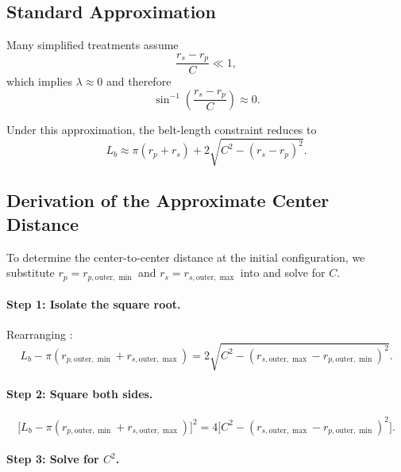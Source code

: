 \documentclass[11pt]{article}
\numberwithin{equation}{section}
\begin{document}
\subsection{Standard Approximation}

Many simplified treatments assume
\[
\frac{r_s - r_p}{C} \ll 1,
\]
which implies $\lambda \approx 0$ and therefore
\[
\sin^{-1}\!\left(\frac{r_s - r_p}{C}\right) \approx 0.
\]

Under this approximation, the belt-length constraint
 reduces to
\begin{equation}
L_b \approx \pi(r_p + r_s) + 2\sqrt{C^2 - (r_s - r_p)^2}.
\label{eq:belt_length_approx}
\end{equation}

\subsection{Derivation of the Approximate Center Distance}

To determine the center-to-center distance at the initial configuration,
we substitute $r_p = r_{p,\text{outer},\min}$ and $r_s = r_{s,\text{outer},\max}$ into
 and solve for $C$.

\paragraph{Step 1: Isolate the square root.}

Rearranging :
\begin{equation}
L_b - \pi(r_{p,\text{outer},\min} + r_{s,\text{outer},\max})
=
2\sqrt{C^2 - (r_{s,\text{outer},\max} - r_{p,\text{outer},\min})^2}.
\label{eq:approx_step1}
\end{equation}

\paragraph{Step 2: Square both sides.}

\begin{equation}
\bigl[L_b - \pi(r_{p,\text{outer},\min} + r_{s,\text{outer},\max})\bigr]^2
=
4\bigl[C^2 - (r_{s,\text{outer},\max} - r_{p,\text{outer},\min})^2\bigr].
\label{eq:approx_step2}
\end{equation}

\paragraph{Step 3: Solve for $C^2$.}
\end{document}
